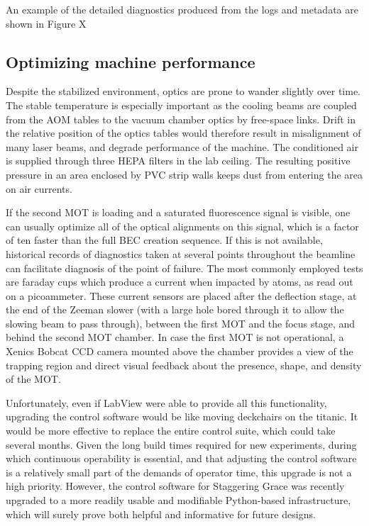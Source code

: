 	An example of the detailed diagnostics produced from the logs and metadata are shown in Figure X 

\subsection*{Optimizing machine performance}

	Despite the stabilized environment, optics are prone to wander slightly over time.
	The stable temperature is especially important as the cooling beams are coupled from the AOM tables to the vacuum chamber optics by free-space links.
	Drift in the relative position of the optics tables would therefore result in misalignment of many laser beams, and degrade performance of the machine.
	The conditioned air is supplied through three HEPA filters in the lab ceiling.
	The resulting positive pressure in an area enclosed by PVC strip walls keeps dust from entering the area on air currents.
	

	If the second MOT is loading and a saturated fluorescence signal is visible, one can usually optimize all of the optical alignments on this signal, which is a factor of ten faster than the full BEC creation sequence.
	If this is not available, historical records of diagnostics taken at several points throughout the beamline can facilitate diagnosis of the point of failure.
	The most commonly employed tests are faraday cups which produce a current when impacted by \mhe atoms, as read out on a picoammeter.
	These current sensors are placed after the deflection stage, at the end of the Zeeman slower (with a large hole bored through it to allow the slowing beam to pass through), between the first MOT and the focus stage, and behind the second MOT chamber.
	In case the first MOT is not operational, a Xenics Bobcat CCD camera mounted above the chamber provides a view of the trapping region and direct visual feedback about the presence, shape, and density of the MOT.
	


	Unfortunately, even if LabView were able to provide all this functionality, upgrading the control software would be like moving deckchairs on the titanic.
	It would be more effective to replace the entire control suite, which could take several months.
	Given the long build times required for new experiments, during which continuous operability is essential, and that adjusting the control software is a relatively small part of the demands of operator time, this upgrade is not a high priority.
	 However, the control software for Staggering Grace was recently upgraded to a more readily usable and modifiable Python-based infrastructure, which will surely prove both helpful and informative for future designs.

